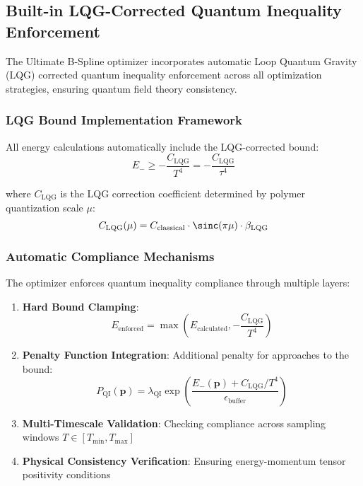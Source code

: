 \documentclass[11pt]{article}
\begin{document}
\subsection{Built-in LQG-Corrected Quantum Inequality Enforcement}

The Ultimate B-Spline optimizer incorporates automatic Loop Quantum Gravity (LQG) corrected quantum inequality enforcement across all optimization strategies, ensuring quantum field theory consistency.

\subsubsection{LQG Bound Implementation Framework}

All energy calculations automatically include the LQG-corrected bound:
\begin{equation}
E_- \geq -\frac{C_{\text{LQG}}}{T^4} = -\frac{C_{\text{LQG}}}{\tau^4}
\end{equation}

where $C_{\text{LQG}}$ is the LQG correction coefficient determined by polymer quantization scale $\mu$:
\begin{equation}
C_{\text{LQG}}(\mu) = C_{\text{classical}} \cdot \sinc(\pi\mu) \cdot \beta_{\text{LQG}}
\end{equation}

\subsubsection{Automatic Compliance Mechanisms}

The optimizer enforces quantum inequality compliance through multiple layers:

\begin{enumerate}
\item \textbf{Hard Bound Clamping}: 
\begin{equation}
E_{\text{enforced}} = \max\left(E_{\text{calculated}}, -\frac{C_{\text{LQG}}}{T^4}\right)
\end{equation}

\item \textbf{Penalty Function Integration}: Additional penalty for approaches to the bound:
\begin{equation}
P_{\text{QI}}(\mathbf{p}) = \lambda_{\text{QI}} \exp\left(\frac{E_-(\mathbf{p}) + C_{\text{LQG}}/T^4}{\epsilon_{\text{buffer}}}\right)
\end{equation}

\item \textbf{Multi-Timescale Validation}: Checking compliance across sampling windows $T \in [T_{\min}, T_{\max}]$

\item \textbf{Physical Consistency Verification}: Ensuring energy-momentum tensor positivity conditions
\end{enumerate}
\end{document}
